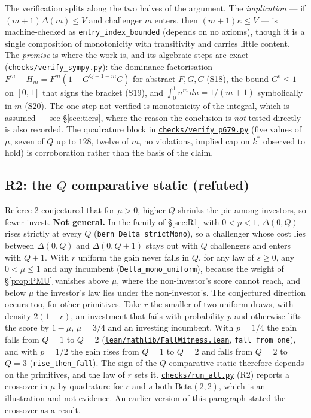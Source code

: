 \documentclass[11pt]{article}
\newcommand{\file}[1]{\href{run:#1}{\texttt{#1}}}
\begin{document}
The verification splits along the two halves of the argument. The
\emph{implication} --- if $(m{+}1)\Delta(m)\le V$ and challenger $m$ enters,
then $(m{+}1)\kappa\le V$ --- is machine-checked as
\texttt{entry\_index\_bounded} (depends on no axioms), though it is a single
composition of monotonicity with transitivity and carries little content. The
\emph{premise} is where the work is, and its algebraic steps are exact
(\file{checks/verify\_sympy.py}): the dominance factorisation
$F^m-H_m=F^m(1-G^{Q-1-m}C)$ for abstract $F,G,C$ (S18), the bound $G^{e}\le1$
on $[0,1]$ that signs the bracket (S19), and $\int_0^1u^m\,du=1/(m{+}1)$
symbolically in $m$ (S20). The one step not verified is monotonicity of the
integral, which is assumed --- see \S\ref{sec:tiers}, where the reason the
conclusion is \emph{not} tested directly is also recorded. The quadrature
block in \file{checks/verify\_p679.py} (five values of $\mu$, seven of $Q$ up
to $128$, twelve of $m$, no violations, implied cap on $k^*$ observed to
hold) is corroboration rather than the basis of the claim.

\subsection{R2: the \texorpdfstring{$Q$}{Q} comparative static (refuted)}
\label{sec:R2}
Referee 2 conjectured that for $\mu>0$, higher $Q$ shrinks the pie
among investors, so fewer invest. \textbf{Not general.} In the family of
\S\ref{sec:R1} with $0<p<1$, $\Delta(0,Q)$ rises strictly at every $Q$
(\texttt{bern\_Delta\_strictMono}), so a challenger whose cost lies between
$\Delta(0,Q)$ and $\Delta(0,Q{+}1)$ stays out with $Q$ challengers and enters
with $Q+1$. With $r$ uniform the gain never falls in $Q$, for any law of
$s\ge0$, any $0<\mu\le1$ and any incumbent (\texttt{Delta\_mono\_uniform}),
because the weight of \S\ref{prop:PMU} vanishes above $\mu$, where the
non-investor's score cannot reach, and below $\mu$ the investor's law lies
under the non-investor's. The conjectured direction occurs too, for other
primitives. Take $r$ the smaller of two uniform draws, with density $2(1-r)$,
an investment that fails with probability $p$ and otherwise lifts the score by
$1-\mu$, $\mu=3/4$ and an investing incumbent. With $p=1/4$ the gain falls
from $Q=1$ to $Q=2$ (\file{lean/mathlib/FallWitness.lean},
\texttt{fall\_from\_one}), and with $p=1/2$ the gain rises from $Q=1$ to $Q=2$
and falls from $Q=2$ to $Q=3$ (\texttt{rise\_then\_fall}). The sign of the $Q$
comparative static therefore depends on the primitives, and the law of $r$
sets it. \file{checks/run\_all.py} (R2) reports a crossover in $\mu$ by
quadrature for $r$ and $s$ both Beta$(2,2)$, which is an illustration and not
evidence. An earlier version of this paragraph stated the crossover as a
result.
\end{document}
